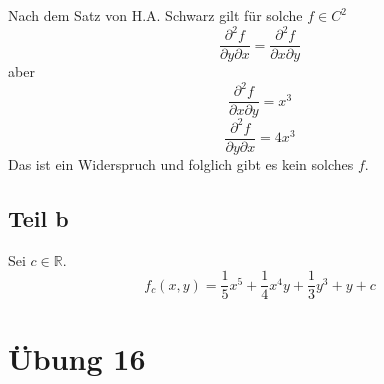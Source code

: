 \documentclass[10pt,a4paper]{article}
\begin{document}
Nach dem Satz von H.A. Schwarz gilt für solche $f \in C^{2}$
\begin{equation}
\frac{\partial^{2} f}{\partial y \partial x} = \frac{\partial^{2} f}{\partial x \partial y}
\end{equation}
aber
\begin{equation}
\frac{\partial^{2} f}{\partial x \partial y} = x^{3}
\end{equation}
\begin{equation}
\frac{\partial^{2} f}{\partial y \partial x} = 4x^{3}
\end{equation}
Das ist ein Widerspruch und folglich gibt es kein solches $f$.

\subsection*{Teil b}

Sei $c \in \mathbb{R}$.
\begin{equation}
f_{c}(x, y) = \frac{1}{5}x^{5} + \frac{1}{4}x^{4}y + \frac{1}{3}y^{3} + y + c
\end{equation}

\section*{Übung 16}
\end{document}
